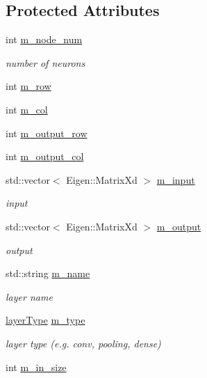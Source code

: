 \subsection*{Protected Attributes}
\begin{DoxyCompactItemize}
\item 
int \hyperlink{class_layer_a59c691d45358bedfe3d0dbc4b1cf4265}{m\+\_\+node\+\_\+num}
\begin{DoxyCompactList}\small\item\em number of neurons \end{DoxyCompactList}\item 
int \hyperlink{class_layer_a2faa0c9318f06ceda4505cbd4671f00e}{m\+\_\+row}
\item 
int \hyperlink{class_layer_aca74b8d744936b335e7b6b0b1210a865}{m\+\_\+col}
\item 
int \hyperlink{class_layer_ad9382e1b855f564939e1bfe019cf1ef1}{m\+\_\+output\+\_\+row}
\item 
int \hyperlink{class_layer_abc7bb3c63481c35c0f1b1e3e9cdea98d}{m\+\_\+output\+\_\+col}
\item 
std\+::vector$<$ Eigen\+::\+Matrix\+Xd $>$ \hyperlink{class_layer_a539fe2109359315ffeee30a865c32606}{m\+\_\+input}
\begin{DoxyCompactList}\small\item\em input \end{DoxyCompactList}\item 
std\+::vector$<$ Eigen\+::\+Matrix\+Xd $>$ \hyperlink{class_layer_a2e934750797431c52b7a8bfc36ff5be3}{m\+\_\+output}
\begin{DoxyCompactList}\small\item\em output \end{DoxyCompactList}\item 
std\+::string \hyperlink{class_layer_a2b075c64ebffde8730a248a5bb5f5133}{m\+\_\+name}
\begin{DoxyCompactList}\small\item\em layer name \end{DoxyCompactList}\item 
\hyperlink{class_layer_a823f18343920cda4f52dce36df6e851f}{layer\+Type} \hyperlink{class_layer_a516bc8d3e48f4a1509ff1c680c3ddeb5}{m\+\_\+type}
\begin{DoxyCompactList}\small\item\em layer type (e.\+g. conv, pooling, dense) \end{DoxyCompactList}\item 
int \hyperlink{class_layer_a81eb09af5acc2c32c92edb735dbb327a}{m\+\_\+in\+\_\+size}

\end{DoxyCompactItemize}
